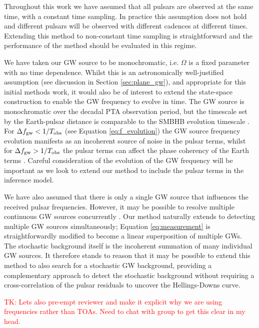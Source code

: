 \documentclass[fleqn,usenatbib,useAMS]{mnras}
\begin{document}
Throughout this work we have assumed that all pulsars are observed at the same time, with a constant time sampling. In practice this assumption does not hold and different pulsars will be observed with different cadences at different times. Extending this method to non-constant time sampling is straightforward and the performance of the method should be evaluated in this regime. \newline 

We have taken our GW source to be monochromatic, i.e. $\Omega$ is a fixed parameter with no time dependence. Whilst this is an astronomically well-justified assumption (see discussion in Section \ref{sec:plane_gw}), and appropriate for this initial methods work, it would also be of interest to extend the state-space construction to enable the GW frequency to evolve in time. The GW source is monochromatic over the decadal PTA observation period, but the timescale set by the Earth-pulsar distance is comparable to the SMBHB evolution timescale \citep{Sesana2010}. For $\Delta f_{\rm gw} < 1 / T_{\rm obs}$ (see Equation \eqref{eq:f_evolution}) the GW source frequency evolution manifests as an incoherent source of noise in the pulsar terms, whilst for  $\Delta f_{\rm gw} > 1 / T_{\rm obs}$ the pulsar terms can affect the phase coherency of the Earth terms \citep{Perrodin2018}. Careful consideration of the evolution of the GW frequency will be important as we look to extend our method to include the pulsar terms in the inference model. \newline 


We have also assumed that there is only a single GW source that influences the received pulsar frequencies. However, it may be possible to resolve multiple continuous GW sources concurrently \citep{PhysRevD.85.044034}. Our method naturally extends to detecting multiple GW sources simultaneously; Equation \eqref{eq:measurement} is straightforwardly modified to become a linear superposition of multiple GWs. The stochastic background itself is the incoherent summation of many individual GW sources. It therefore stands to reason that it may be possible to extend this method to also search for a stochastic GW background, providing a complementary approach to detect the stochastic background without requiring a cross-correlation of the pulsar residuals to uncover the Hellings-Downs curve. \newline 


\textcolor{red}{TK: Lets also pre-empt reviewer and make it explicit why we are using frequencies rather than TOAs. Need to chat with group to get this clear in my head.}
\end{document}
